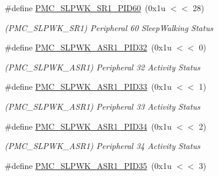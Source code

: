 \begin{DoxyCompactItemize}
\mbox{\label{group__SAME70__PMC_ga0fba1f8f21ab792628bcfbadf8414caf}} 
\#define \mbox{\hyperlink{group__SAME70__PMC_ga0fba1f8f21ab792628bcfbadf8414caf}{P\+M\+C\+\_\+\+S\+L\+P\+W\+K\+\_\+\+S\+R1\+\_\+\+P\+I\+D60}}~(0x1u $<$$<$ 28)
\begin{DoxyCompactList}\small\item\em (P\+M\+C\+\_\+\+S\+L\+P\+W\+K\+\_\+\+S\+R1) Peripheral 60 Sleep\+Walking Status \end{DoxyCompactList}\item 
\mbox{\label{group__SAME70__PMC_gaed7cd2ef02c6f1713bdccbe5129452e6}} 
\#define \mbox{\hyperlink{group__SAME70__PMC_gaed7cd2ef02c6f1713bdccbe5129452e6}{P\+M\+C\+\_\+\+S\+L\+P\+W\+K\+\_\+\+A\+S\+R1\+\_\+\+P\+I\+D32}}~(0x1u $<$$<$ 0)
\begin{DoxyCompactList}\small\item\em (P\+M\+C\+\_\+\+S\+L\+P\+W\+K\+\_\+\+A\+S\+R1) Peripheral 32 Activity Status \end{DoxyCompactList}\item 
\mbox{\label{group__SAME70__PMC_gaab6384d4de4c6b740e9b296fcf8a9843}} 
\#define \mbox{\hyperlink{group__SAME70__PMC_gaab6384d4de4c6b740e9b296fcf8a9843}{P\+M\+C\+\_\+\+S\+L\+P\+W\+K\+\_\+\+A\+S\+R1\+\_\+\+P\+I\+D33}}~(0x1u $<$$<$ 1)
\begin{DoxyCompactList}\small\item\em (P\+M\+C\+\_\+\+S\+L\+P\+W\+K\+\_\+\+A\+S\+R1) Peripheral 33 Activity Status \end{DoxyCompactList}\item 
\mbox{\label{group__SAME70__PMC_ga90ef4c6d673fd5ed2b74616a0490df94}} 
\#define \mbox{\hyperlink{group__SAME70__PMC_ga90ef4c6d673fd5ed2b74616a0490df94}{P\+M\+C\+\_\+\+S\+L\+P\+W\+K\+\_\+\+A\+S\+R1\+\_\+\+P\+I\+D34}}~(0x1u $<$$<$ 2)
\begin{DoxyCompactList}\small\item\em (P\+M\+C\+\_\+\+S\+L\+P\+W\+K\+\_\+\+A\+S\+R1) Peripheral 34 Activity Status \end{DoxyCompactList}\item 
\mbox{\label{group__SAME70__PMC_ga9dc24631242c68111df9bb4e8b075060}} 
\#define \mbox{\hyperlink{group__SAME70__PMC_ga9dc24631242c68111df9bb4e8b075060}{P\+M\+C\+\_\+\+S\+L\+P\+W\+K\+\_\+\+A\+S\+R1\+\_\+\+P\+I\+D35}}~(0x1u $<$$<$ 3)
$$
\end{DoxyCompactItemize}
